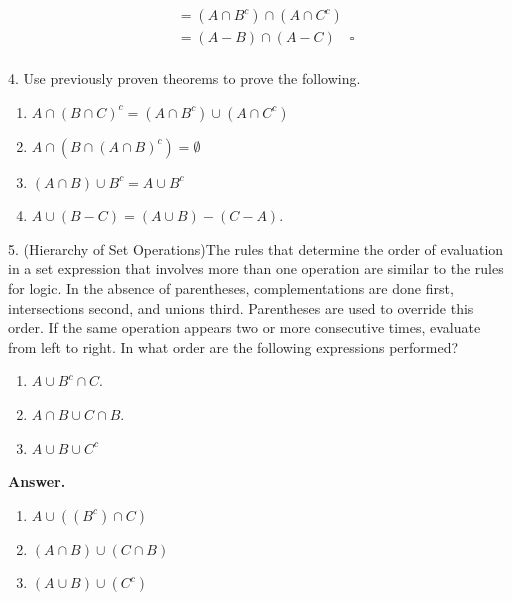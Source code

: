 \documentclass[10pt,]{book}
\theoremstyle{plain}
\theoremstyle{definition}
\theoremstyle{definition}
\theoremstyle{definition}
\begin{document}
\begin{exercisegroup}
\begin{enumerate}[label=\alph*]
\begin{equation*}
\begin{split}
              & =(A\cap B^c)\cap (A\cap C^c)\\
              & =(A-B)\cap (A-C)  \quad \square\\
   \end{split}
	\end{equation*}%
\end{enumerate}
%
\item[4.]\hypertarget{exercise-9}{} Use previously proven theorems to prove the following.%
\par
\leavevmode%
\begin{enumerate}[label=\alph*]
\item\hypertarget{li-42}{}  \(A \cap (B\cap C)^c= (A\cap B^c)\cup (A\cap C^{c })\)%
\item\hypertarget{li-43}{}  \(A \cap (B\cap (A\cap B)^c)= \emptyset\)%
\item\hypertarget{li-44}{}  \((A\cap B) \cup  B^c = A \cup  B^c\)%
\item\hypertarget{li-45}{}  \(A \cup  (B - C) = (A \cup  B) - (C - A)\).%
\end{enumerate}
%
\par\smallskip
\item[5.]\hypertarget{exercise-10}{}(Hierarchy of Set Operations)\space\space{}The rules that determine the order of evaluation in a set expression that involves more than one operation are similar to the rules for logic. In the absence of parentheses, complementations are done first, intersections second, and unions third. Parentheses are used to override this order. If the same operation appears two or more consecutive times, evaluate from left to right. In what order are the
following expressions performed?%
\par
\leavevmode%
\begin{multicols}{2}
\begin{enumerate}[label=\alph*]
\item\hypertarget{li-46}{}\(A \cup  B^c\cap C\). %
\item\hypertarget{li-47}{}\(A\cap B \cup  C\cap B\). %
\item\hypertarget{li-48}{}\(A \cup  B \cup  C^c\) %
\end{enumerate}
\end{multicols}
%
\par\smallskip
\par\smallskip
\noindent\textbf{Answer.}\hypertarget{answer-5}{}\quad
\leavevmode%
\begin{multicols}{3}
\begin{enumerate}[label=\alph*]
\item\hypertarget{li-49}{} \(A\cup ((B^c)\cap C)\) %
\item\hypertarget{li-50}{} \((A\cap B)\cup (C\cap B)\) %
\item\hypertarget{li-51}{} \((A\cup B)\cup (C^c)\)%
\end{enumerate}
\end{multicols}
%
\end{exercisegroup}
\end{document}
